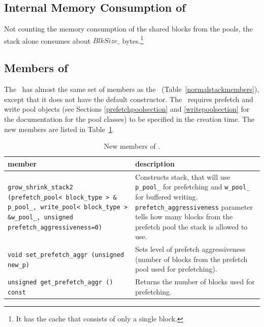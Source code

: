 \documentclass[twoside]{book}
\begin{document}

\subsection*{Internal Memory Consumption of \xgsstacktwo}
Not counting the memory consumption of the shared blocks from the
pools, the stack alone consumes about $BlkSize\_$ bytes.\footnote{It has
the cache that consists of only a single block.}

\subsection*{Members of \xgsstacktwo}
The \xgsstacktwo\ has almost the same set of members as the
\xnormalstack\
(Table~\ref{normalstackmembers}), except that it does not have the
default constructor. The \xgsstacktwo\ requires
prefetch and write pool objects (see Sections
\ref{prefetchpoolsection} and \ref{writepoolsection} for the
documentation for the pool classes) to be specified in the creation
time. 
The new members are listed in Table~\ref{gsstacktwomembers}.

\begin{table}[h]
\begin{center}
\caption{New members of \xgsstacktwo.}
\label{gsstacktwomembers}
\begin{tabular}{|p{6cm}|p{5cm}|}
\hline
member & description  \\
\hline\hline
\texttt{grow\_shrink\_stack2 (prefetch\_pool< block\_type > \&
p\_pool\_, write\_pool< block\_type > \&w\_pool\_, unsigned
prefetch\_aggressiveness=0)} &  Constructs stack, that will use
\texttt{p\_pool\_} for prefetching and \texttt{w\_pool\_} for buffered
writing. \texttt{prefetch\_aggressiveness} parameter tells how many
blocks from the prefetch pool the stack is allowed to use.\\  
\hline
\texttt{void set\_prefetch\_aggr (unsigned new\_p)} & Sets level of
prefetch aggressiveness (number of blocks from the prefetch pool used
for prefetching). \\
\hline
\texttt{unsigned get\_prefetch\_aggr () const} & Returns the number of
blocks used for prefetching. \\
\hline
\end{tabular}
\end{center}
\end{table}


\newcommand{\xmstack}{\texttt{stxxl::migrating\_stack}}
\end{document}
